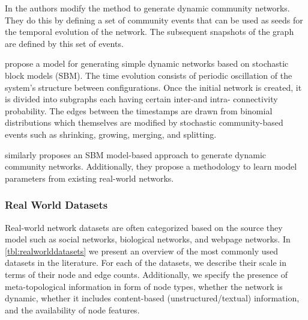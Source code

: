 \documentclass[
acmsmall,
nonacm,
screen,
acmthm]{acmart}
\begin{document}
In \citet{greeneTrackingEvolutionCommunities2010} the authors modify the
\citet{lancichinettiBenchmarkGraphsTesting2008} method to generate
dynamic community networks. They do this by defining a set of community
events that can be used as seeds for the temporal evolution of the
network. The subsequent snapshots of the graph are defined by this set
of events.

\citet{granellBenchmarkModelAssess2015} propose a model for generating
simple dynamic networks based on stochastic block models (SBM). The time
evolution consists of periodic oscillation of the system's structure
between configurations. Once the initial network is created, it is
divided into subgraphs each having certain inter-and intra- connectivity
probability. The edges between the timestamps are drawn from binomial
distributions which themselves are modified by stochastic
community-based events such as shrinking, growing, merging, and
splitting.

\citet{ghalebiDynamicNetworkModel2019} similarly proposes an SBM
model-based approach to generate dynamic community networks.
Additionally, they propose a methodology to learn model parameters from
existing real-world networks.

\hypertarget{real-world-datasets}{%
\subsubsection{Real World Datasets}\label{real-world-datasets}}

Real-world network datasets are often categorized based on the source
they model such as social networks, biological networks, and webpage
networks. In \cref{tbl:realworlddatasets} we present an overview of the
most commonly used datasets in the literature. For each of the datasets,
we describe their scale in terms of their node and edge counts.
Additionally, we specify the presence of meta-topological information in
form of node types, whether the network is dynamic, whether it includes
content-based (unstructured/textual) information, and the availability
of node features.
\end{document}
